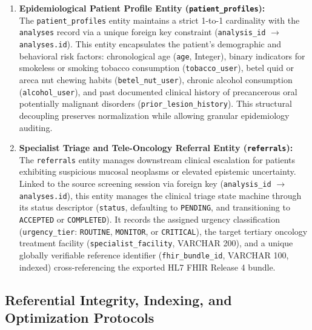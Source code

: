 \documentclass[12pt,a4paper,oneside]{report}
\begin{document}
\begin{enumerate}[label=\textbf{\arabic*.}, leftmargin=*]
    \item \textbf{Epidemiological Patient Profile Entity (\texttt{patient\_profiles}):} \\
    The \texttt{patient\_profiles} entity maintains a strict 1-to-1 cardinality with the \texttt{analyses} record via a unique foreign key constraint (\texttt{analysis\_id} $\rightarrow$ \texttt{analyses.id}). This entity encapsulates the patient's demographic and behavioral risk factors: chronological age (\texttt{age}, Integer), binary indicators for smokeless or smoking tobacco consumption (\texttt{tobacco\_user}), betel quid or areca nut chewing habits (\texttt{betel\_nut\_user}), chronic alcohol consumption (\texttt{alcohol\_user}), and past documented clinical history of precancerous oral potentially malignant disorders (\texttt{prior\_lesion\_history}). This structural decoupling preserves normalization while allowing granular epidemiology auditing.
    
    \item \textbf{Specialist Triage and Tele-Oncology Referral Entity (\texttt{referrals}):} \\
    The \texttt{referrals} entity manages downstream clinical escalation for patients exhibiting suspicious mucosal neoplasms or elevated epistemic uncertainty. Linked to the source screening session via foreign key (\texttt{analysis\_id} $\rightarrow$ \texttt{analyses.id}), this entity manages the clinical triage state machine through its status descriptor (\texttt{status}, defaulting to \texttt{PENDING}, and transitioning to \texttt{ACCEPTED} or \texttt{COMPLETED}). It records the assigned urgency classification (\texttt{urgency\_tier}: \texttt{ROUTINE}, \texttt{MONITOR}, or \texttt{CRITICAL}), the target tertiary oncology treatment facility (\texttt{specialist\_facility}, VARCHAR 200), and a unique globally verifiable reference identifier (\texttt{fhir\_bundle\_id}, VARCHAR 100, indexed) cross-referencing the exported HL7 FHIR Release 4 bundle.
\end{enumerate}

\subsection{Referential Integrity, Indexing, and Optimization Protocols}
\end{document}
